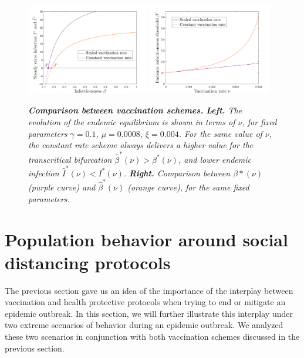 \documentclass[10pt]{article}
\begin{document}
\begin{figure}[h!]
\begin{center}
\includegraphics[width=0.48\textwidth]{figures/scheme_comparison_infection.png}
\includegraphics[width=0.48\textwidth]{figures/beta_star_comparison.png}
\end{center}
\caption{\emph{{\bf Comparison between vaccination schemes.} {\bf Left.} The evolution of the endemic equilibrium is shown in terms of $\nu$, for fixed parameters $\gamma=0.1$, $\mu = 0.0008$, $\xi=0.004$. For the same value of $\nu$, the constant rate scheme always delivers a higher value for the transcritical bifurcation $\hat{\beta}^*(\nu)>\beta^*(\nu)$, and lower endemic infection $\hat{I}^*(\nu)<I^*(\nu)$. {\bf Right.} Comparison between $\beta*(\nu)$ (purple curve) and $\hat{\beta}^*(\nu)$ (orange curve), for the same fixed parameters.}}
\label{comparison}
\end{figure}


\section{Population behavior around social distancing protocols} 

The previous section gave us an idea of the importance of the interplay between vaccination and health protective protocols when trying to end or mitigate an epidemic outbreak. In this section, we will further illustrate this interplay under two extreme scenarios of behavior during an epidemic outbreak. We analyzed these two scenarios in conjunction with both vaccination schemes discussed in the previous section.
\end{document}
